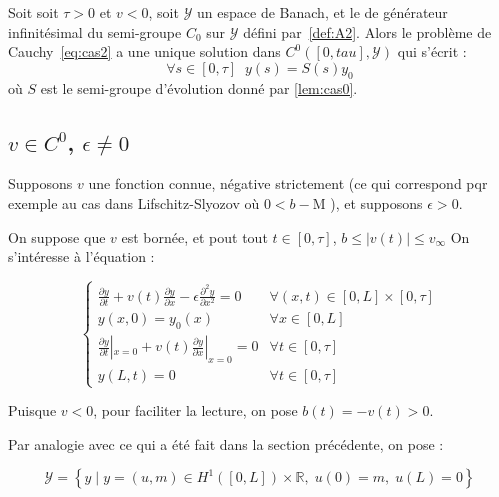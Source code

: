 \documentclass[a4paper]{article}
\newcommand{\dep}{b}
\newcommand{\mass}{\mathrm{M}}
\begin{document}
\begin{theoreme}
	Soit soit $\tau>0$ et $v<0$,
	soit $\mathscr{Y}$ un espace de Banach, et le  
	de générateur infinitésimal du semi-groupe $C_0$ sur $\mathscr{Y}$
	défini par~\eqref{def:A2}.
	Alors le problème de Cauchy~\eqref{eq:cas2} a une unique solution dans $C^0([0,tau],\mathscr{Y})$ qui s'écrit :
	\[ \forall s\in[0,\tau] \; \; y(s) = S(s)y_0 \]
	où $S$ est le semi-groupe d'évolution donné par \ref{lem:cas0}.
\end{theoreme}




\vspace{1.0cm}
\subsection{$v \in C^0$, $\epsilon \ne 0$}

Supposons $v$ une fonction connue, négative strictement 
(ce qui correspond pqr exemple au cas dans Lifschitz-Slyozov où $0<\dep -\mass $ ), 
et supposons $\epsilon>0$. 

On suppose que $v$ est bornée, et pout tout $t \in[0,\tau]$, 
$ \dep \leq |v(t)| \leq v_{\infty} $
On s'intéresse à l'équation :


\begin{equation}
\label{eq:cas3}
\begin{cases}
 \displaystyle \frac{\partial y}{\partial t}
 + v(t) \frac{\partial y} {\partial x}  
 - \epsilon \frac{\partial^2 y} {\partial x^2}
 = 0  & \forall (x,t) \in [0,L] \times [0, \tau]\\
 y(x,0) = y_{0} (x) & \forall x \in [0,L] \\
 \displaystyle \frac{\partial y}{\partial t}|_{x=0}
 + v(t) \frac{\partial y} {\partial x}|_{x=0} = 0 & \forall t \in [0,\tau]\\
 y(L,t)=0 & \forall t \in [0,\tau]
\end{cases}
\end{equation}

Puisque $v<0$, pour faciliter la lecture, on pose $\dep (t) = - v(t) >0$.

Par analogie avec ce qui a été fait dans la section précédente, on pose : 

\[\mathscr{Y} = \left\{ y \; | \; y = (u,m) \in H^1([0,L])\times \mathbb{R},
 \; u(0)=m, \; u(L)=0 \right\} \]
 
\end{document}
